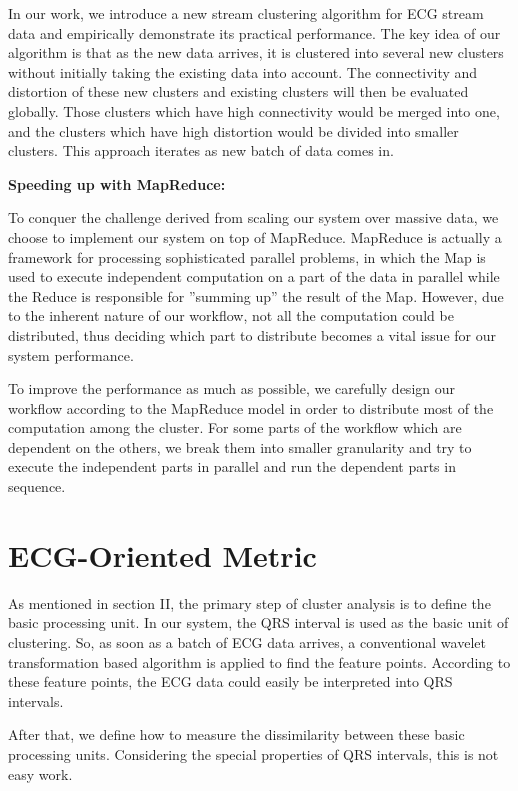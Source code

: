 \documentclass[conference]{IEEEtran}
\begin{document}
In our work, we introduce a new stream clustering algorithm for ECG stream data and empirically demonstrate its practical performance. The key idea of our algorithm is that as the new data arrives, it is clustered into several new clusters without initially taking the existing data into account. The connectivity and distortion of these new clusters and existing clusters will then be evaluated globally. Those clusters which have high connectivity would be merged into one, and the clusters which have high distortion would be divided into smaller clusters. This approach iterates as new batch of data comes in.


\textbf{Speeding up with MapReduce:}


To conquer the challenge derived from scaling our system over massive data, we choose to implement our system on top of MapReduce. MapReduce is actually a framework for processing sophisticated parallel problems, in which the Map is used to execute independent computation on a part of the data in parallel while the Reduce is responsible for ''summing up'' the result of the Map. However, due to the inherent nature of our workflow, not all the computation could be distributed, thus deciding which part to distribute becomes a vital issue for our system performance.


To improve the performance as much as possible, we carefully design our workflow according to the MapReduce model in order to distribute most of the computation among the cluster. For some parts of the workflow which are dependent on the others, we break them into smaller granularity and try to execute the independent parts in parallel and run the dependent parts in sequence.



\section{ECG-Oriented Metric}
As mentioned in section II, the primary step of cluster analysis is to define the basic processing unit. In our system, the QRS interval is used as the basic unit of clustering. So, as soon as a batch of ECG data arrives, a conventional wavelet transformation based algorithm is applied to find the feature points. According to these feature points, the ECG data could easily be interpreted into QRS intervals.

After that, we define how to measure the dissimilarity between these basic processing units. Considering the special properties of QRS intervals, this is not easy work.
\end{document}

